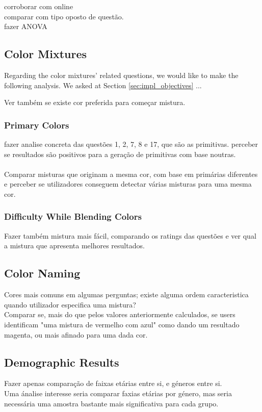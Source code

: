 corroborar com online \\
comparar com tipo oposto de questão. \\
fazer ANOVA \\
%
\subsection{Color Mixtures}
\label{subsec:results_colormixtures}
%
Regarding the color mixtures' related questions, we would like to make the following analysis. We asked at Section \ref{sec:impl_objectives} ... \par
Ver também se existe cor preferida para começar mistura.
%
\subsubsection{Primary Colors}
\label{subsubsec:primarycolors}
%
fazer analise concreta das questões 1, 2, 7, 8 e 17, que são as primitivas. perceber se resultados são positivos para a geração de primitivas com base noutras. \\\\
%
Comparar misturas que originam a mesma cor, com base em primárias diferentes e perceber se utilizadores conseguem detectar várias
misturas para uma mesma cor. \par
%
\subsubsection{Difficulty While Blending Colors}
\label{subsubsec:difficulty_rating}
%
Fazer também mistura mais fácil, comparando os ratings das questões e ver qual a mistura que apresenta melhores resultados. \\
%
\subsection{Color Naming}
\label{subsec:results_namingcolors}
%
Cores mais comuns em algumas perguntas; existe alguma ordem caracteristica quando utilizador especifica uma mistura? \\
Comparar se, mais do que pelos valores anteriormente calculados, se users identificam "uma mistura de vermelho com azul" como dando um resultado
magenta, ou mais afinado para uma dada cor.
%
\subsection{Demographic Results}
\label{subsec:results_demographic}
%
Fazer apenas comparação de faixas etárias entre si, e géneros entre si. \\
Uma ánalise interesse seria comparar faxias etárias por género, mas seria necessária uma amostra bastante mais significativa para cada grupo.
%
